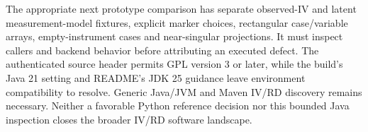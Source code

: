 The appropriate next prototype comparison has separate observed-IV and latent
measurement-model fixtures, explicit marker choices, rectangular case/variable
arrays, empty-instrument cases and near-singular projections. It must inspect
callers and backend behavior before attributing an executed defect. The
authenticated source header permits GPL version 3 or later, while the build's
Java 21 setting and README's JDK 25 guidance leave environment compatibility
to resolve. Generic Java/JVM and Maven IV/RD discovery remains necessary.
Neither a favorable Python reference decision nor this bounded Java inspection
closes the broader IV/RD software landscape.
